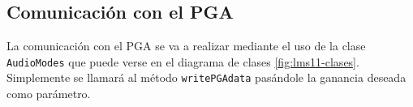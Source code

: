 \subsection{Comunicación con el PGA}

La comunicación con el \acrshort{PGA} se va a realizar mediante el uso de la clase \texttt{AudioModes} que puede verse en el diagrama de clases \ref{fig:lms11-clases}. Simplemente se llamará al método \texttt{writePGAdata} pasándole la ganancia deseada como parámetro.